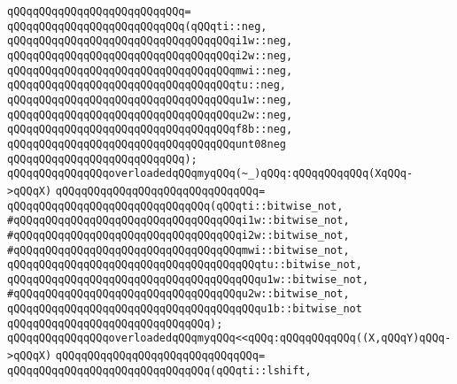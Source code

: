 \verb|qQQqqQQqqQQqqQQqqQQqqQQqqQQq=|\newline
\verb|qQQqqQQqqQQqqQQqqQQqqQQqqQQq(qQQqti::neg,|\newline
\verb|qQQqqQQqqQQqqQQqqQQqqQQqqQQqqQQqqQQqi1w::neg,|\newline
\verb|qQQqqQQqqQQqqQQqqQQqqQQqqQQqqQQqqQQqi2w::neg,|\newline
\verb|qQQqqQQqqQQqqQQqqQQqqQQqqQQqqQQqqQQqmwi::neg,|\newline
\verb|qQQqqQQqqQQqqQQqqQQqqQQqqQQqqQQqqQQqtu::neg,|\newline
\verb|qQQqqQQqqQQqqQQqqQQqqQQqqQQqqQQqqQQqu1w::neg,|\newline
\verb|qQQqqQQqqQQqqQQqqQQqqQQqqQQqqQQqqQQqu2w::neg,|\newline
\verb|qQQqqQQqqQQqqQQqqQQqqQQqqQQqqQQqqQQqf8b::neg,|\newline
\verb|qQQqqQQqqQQqqQQqqQQqqQQqqQQqqQQqqQQqunt08neg|\newline
\verb|qQQqqQQqqQQqqQQqqQQqqQQqqQQq);|\newline
\newline
\verb|qQQqqQQqqQQqqQQqoverloadedqQQqmyqQQq(~_)qQQq:qQQqqQQqqQQq(XqQQq->qQQqX)|\newline
\verb|qQQqqQQqqQQqqQQqqQQqqQQqqQQqqQQq=|\newline
\verb|qQQqqQQqqQQqqQQqqQQqqQQqqQQqqQQq(qQQqti::bitwise_not,|\newline
\verb|#qQQqqQQqqQQqqQQqqQQqqQQqqQQqqQQqqQQqi1w::bitwise_not,|\newline
\verb|#qQQqqQQqqQQqqQQqqQQqqQQqqQQqqQQqqQQqi2w::bitwise_not,|\newline
\verb|#qQQqqQQqqQQqqQQqqQQqqQQqqQQqqQQqqQQqmwi::bitwise_not,|\newline
\verb|qQQqqQQqqQQqqQQqqQQqqQQqqQQqqQQqqQQqqQQqtu::bitwise_not,|\newline
\verb|qQQqqQQqqQQqqQQqqQQqqQQqqQQqqQQqqQQqqQQqu1w::bitwise_not,|\newline
\verb|#qQQqqQQqqQQqqQQqqQQqqQQqqQQqqQQqqQQqu2w::bitwise_not,|\newline
\verb|qQQqqQQqqQQqqQQqqQQqqQQqqQQqqQQqqQQqqQQqu1b::bitwise_not|\newline
\verb|qQQqqQQqqQQqqQQqqQQqqQQqqQQqqQQq);|\newline
\newline
\verb|qQQqqQQqqQQqqQQqoverloadedqQQqmyqQQq<<qQQq:qQQqqQQqqQQq((X,qQQqY)qQQq->qQQqX)|\newline
\verb|qQQqqQQqqQQqqQQqqQQqqQQqqQQqqQQq=|\newline
\verb|qQQqqQQqqQQqqQQqqQQqqQQqqQQqqQQq(qQQqti::lshift,|\newline

